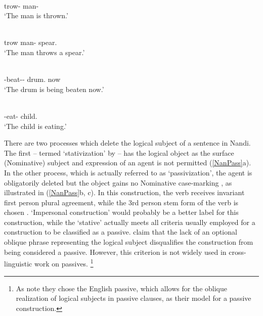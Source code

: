 \begin{exe}\ex\label{MurPass}
\begin{xlist}
\ex\gll {} \\
trow-\pass{} man-\nom{}\\
\glt `The man is thrown.' %

\ex\gll{}  \\
trow man-\nom{} spear.\acc{}\\
\glt `The man throws a spear.' %
\end{xlist}
\end{exe}

\begin{exe}\ex{}
\begin{xlist}
\ex\label{TenPass}\gll{} \textbf{} \\
\ipfv{}-beat-\epen{}-\pass{} drum.\nom{} now\\
\glt `The drum is being beaten now.' 

\ex\label{TenAntiPass}\gll{} \textbf{}\\
\ipfv{}-eat-\antip{} child.\nom{}\\
\glt `The child is eating.'  
\end{xlist}
\end{exe}

There are two processes which delete the logical subject of a sentence in Nandi. 
The first -- termed `stativization' by \citeauthor{Creider:1989} -- has the logical object as the surface (Nominative) subject and expression of an agent is not permitted (\ref{NanPass}a).
In the other process, which is actually referred to as `passivization', the agent is obligatorily deleted but the object gains no Nominative case-marking \citep[125--126]{Creider:1989}, as illustrated in (\ref{NanPass}b, c). 
In this construction, the verb receives invariant first person plural agreement, while the 3rd person stem form of the verb is chosen \citep[100]{Creider:1989}. `Impersonal construction' would probably be a better label for this construction, while the `stative' actually meets all criteria usually employed for a construction to be classified as a passive. \citet{Creider:1989} claim that the lack of an optional oblique phrase representing the logical subject disqualifies the construction from being considered a passive. 
However, this criterion is not widely used in cross-linguistic work on passives.
\footnote{As \citet[100]{Creider:1989} note they chose the English passive, which allows for the oblique realization of logical subjects in passive clauses, as their model for a passive construction.}

